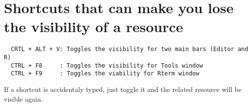 
\section{Shortcuts that can make you lose the visibility of a resource}

\begin{verbatim}
  CRTL + ALT + V: Toggles the visibility for two main bars (Editor and R)
  CTRL + F8     : Toggles the visibility for Tools window
  CTRL + F9     : Toggles the viability for Rterm window
\end{verbatim}

If a shortcut is accidentaly typed, just toggle it and the related resource will be visible again.
